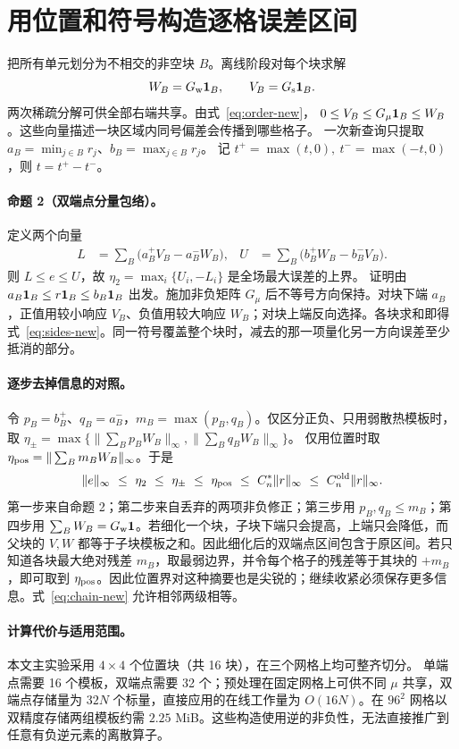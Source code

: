 \section{用位置和符号构造逐格误差区间}
把所有单元划分为不相交的非空块 $B$。离线阶段对每个块求解
\[
 W_B=G_{\rm w}{\bf1}_B,\qquad V_B=G_{\rm s}{\bf1}_B .
\]
两次稀疏分解可供全部右端共享。由式~\eqref{eq:order-new}，
$0\le V_B\le G_\mu{\bf1}_B\le W_B$。这些向量描述一块区域内同号偏差会传播到哪些格子。
一次新查询只提取 $a_B=\min_{j\in B}r_j$、$b_B=\max_{j\in B}r_j$。
记 $t^+=\max(t,0),\ t^-=\max(-t,0)$，则 $t=t^+-t^-$。

\paragraph{命题 2（双端点分量包络）。}
定义两个向量
\begin{align}
 L&=\sum_B\big(a_B^+ V_B-a_B^- W_B\big),&
 U&=\sum_B\big(b_B^+ W_B-b_B^- V_B\big). \label{eq:sides-new}
\end{align}
则 $L\le e\le U$，故 $\eta_2=\max_i\{U_i,-L_i\}$ 是全场最大误差的上界。
证明由 $a_B{\bf1}_B\le r{\bf1}_B\le b_B{\bf1}_B$ 出发。施加非负矩阵 $G_\mu$ 后不等号方向保持。对块下端 $a_B$，正值用较小响应 $V_B$、负值用较大响应 $W_B$；对块上端反向选择。各块求和即得式~\eqref{eq:sides-new}。同一符号覆盖整个块时，减去的那一项量化另一方向误差至少抵消的部分。

\paragraph{逐步去掉信息的对照。}
令 $p_B=b_B^+$、$q_B=a_B^-$，$m_B=\max(p_B,q_B)$。仅区分正负、只用弱散热模板时，取
$\eta_{\pm}=\max\{\|\sum_B p_BW_B\|_\infty,\|\sum_B q_BW_B\|_\infty\}$。
仅用位置时取 $\eta_{\rm pos}=\|\sum_Bm_BW_B\|_\infty$。于是
\begin{equation}
 \|e\|_\infty\ \le\ \eta_2\ \le\ \eta_{\pm}\ \le\
 \eta_{\rm pos}\ \le\ C_n^*\|r\|_\infty\
 \le\ C_n^{\rm old}\|r\|_\infty. \label{eq:chain-new}
\end{equation}
第一步来自命题 2；第二步来自丢弃的两项非负修正；第三步用 $p_B,q_B\le m_B$；第四步用 $\sum_BW_B=G_{\rm w}{\bf1}$。若细化一个块，子块下端只会提高，上端只会降低，而父块的 $V,W$ 都等于子块模板之和。因此细化后的双端点区间包含于原区间。若只知道各块最大绝对残差 $m_B$，取最弱边界，并令每个格子的残差等于其块的 $+m_B$，即可取到 $\eta_{\rm pos}$。因此位置界对这种摘要也是尖锐的；继续收紧必须保存更多信息。式~\eqref{eq:chain-new} 允许相邻两级相等。

\paragraph{计算代价与适用范围。}
本文主实验采用 $4\times4$ 个位置块（共 16 块），在三个网格上均可整齐切分。
单端点需要 16 个模板，双端点需要 32 个；预处理在固定网格上可供不同 $\mu$ 共享，双端点存储量为 $32N$ 个标量，直接应用的在线工作量为 $O(16N)$。在 $96^2$ 网格以双精度存储两组模板约需 $2.25$ MiB。这些构造使用逆的非负性，无法直接推广到任意有负逆元素的离散算子。
